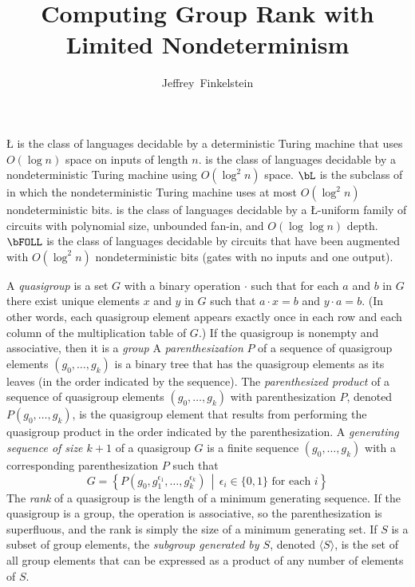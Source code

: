 \documentclass{article}
\title{Computing Group Rank with Limited Nondeterminism}
\author{Jeffrey~Finkelstein}
\begin{document}
\maketitle

\L{} is the class of languages decidable by a deterministic Turing machine that uses $O(\log n)$ space on inputs of length $n$.
\NL{} is the class of languages decidable by a nondeterministic Turing machine using $O(\log^2 n)$ space.
$\bL$ is the subclass of \NL{} in which the nondeterministic Turing machine uses at most $O(\log^2 n)$ nondeterministic bits.
\FOLL{} is the class of languages decidable by a \L-uniform family of circuits with polynomial size, unbounded fan-in, and $O(\log \log n)$ depth.
$\bFOLL$ is the class of languages decidable by \FOLL{} circuits that have been augmented with $O(\log^2 n)$ nondeterministic bits (gates with no inputs and one output).

A \emph{quasigroup} is a set $G$ with a binary operation $\cdot$ such that for each $a$ and $b$ in $G$ there exist unique elements $x$ and $y$ in $G$ such that $a \cdot x = b$ and $y \cdot a = b$.
(In other words, each quasigroup element appears exactly once in each row and each column of the multiplication table of $G$.)
If the quasigroup is nonempty and associative, then it is a \emph{group}
A \emph{parenthesization} $P$ of a sequence of quasigroup elements $(g_0, \dotsc, g_k)$ is a binary tree that has the quasigroup elements as its leaves (in the order indicated by the sequence).
The \emph{parenthesized product} of a sequence of quasigroup elements $(g_0, \dotsc, g_k)$ with parenthesization $P$, denoted $P(g_0, \dotsc, g_k)$, is the quasigroup element that results from performing the quasigroup product in the order indicated by the parenthesization.
A \emph{generating sequence of size $k + 1$} of a quasigroup $G$ is a finite sequence $(g_0, \dotsc, g_k)$ with a corresponding parenthesization $P$ such that
$$
G = \left\{P\left(g_0, g_1^{\epsilon_1}, \dotsc, g_k^{\epsilon_k}\right) \, \middle| \, \epsilon_i \in \{0, 1\} \text{ for each } i \right\}
$$
The \emph{rank} of a quasigroup is the length of a minimum generating sequence.
If the quasigroup is a group, the operation is associative, so the parenthesization is superfluous, and the rank is simply the size of a minimum generating set.
If $S$ is a subset of group elements, the \emph{subgroup generated by $S$}, denoted $\langle S \rangle$, is the set of all group elements that can be expressed as a product of any number of elements of $S$.
\end{document}
